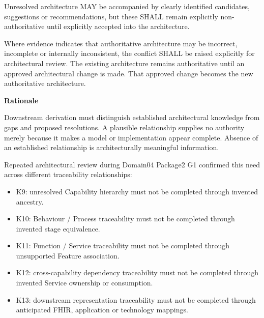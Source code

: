 Unresolved architecture MAY be accompanied by clearly identified
candidates, suggestions or recommendations, but these SHALL remain
explicitly non-authoritative until explicitly accepted into the
architecture.



Where evidence indicates that authoritative architecture may be incorrect,
incomplete or internally inconsistent, the conflict SHALL be raised
explicitly for architectural review. The existing architecture remains
authoritative until an approved architectural change is made. That
approved change becomes the new authoritative architecture.



\par\medskip\textbf{Rationale}\par


Downstream derivation must distinguish established architectural knowledge
from gaps and proposed resolutions. A plausible relationship supplies no
authority merely because it makes a model or implementation appear
complete. Absence of an established relationship is architecturally
meaningful information.



Repeated architectural review during Domain04 Package2 G1 confirmed this
need across different traceability relationships:



\begin{itemize}


\item K9: unresolved Capability hierarchy must not be completed through
  invented ancestry.

\item K10: Behaviour / Process traceability must not be completed through
  invented stage equivalence.

\item K11: Function / Service traceability must not be completed through
  unsupported Feature association.

\item K12: cross-capability dependency traceability must not be completed
  through invented Service ownership or consumption.

\item K13: downstream representation traceability must not be completed through
  anticipated FHIR, application or technology mappings.

\end{itemize}


